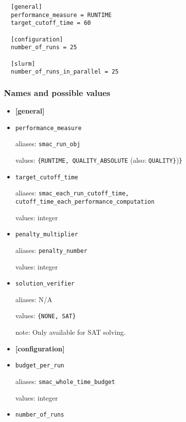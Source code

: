 \documentclass{article}
\begin{document}
\begin{verbatim}
  [general]
  performance_measure = RUNTIME
  target_cutoff_time = 60

  [configuration]
  number_of_runs = 25

  [slurm]
  number_of_runs_in_parallel = 25
\end{verbatim}

\subsubsection{Names and possible values}
\label{sect:settings_details}
\begin{itemize}[noitemsep]
  \item[] \textbf{[general]}\\
  \item[] \texttt{performance\_measure}

          aliases: \texttt{smac\_run\_obj}

          values: \texttt{\{RUNTIME, QUALITY\_ABSOLUTE} (also: \texttt{QUALITY\}})\texttt{\}}\\
  \item[] \texttt{target\_cutoff\_time}

          aliases: \texttt{smac\_each\_run\_cutoff\_time, cutoff\_time\_each\_performance\_computation}

          values: integer\\
  \item[] \texttt{penalty\_multiplier}

          aliases: \texttt{penalty\_number}

          values: integer\\
  \item[] \texttt{solution\_verifier}

          aliases: N/A

          values: \texttt{\{NONE, SAT\}}

          note: Only available for SAT solving.\\
  \item[] \textbf{[configuration]}\\
  \item[] \texttt{budget\_per\_run}

          aliases: \texttt{smac\_whole\_time\_budget}

          values: integer\\
  \item[] \texttt{number\_of\_runs}


\end{itemize}
\end{document}
